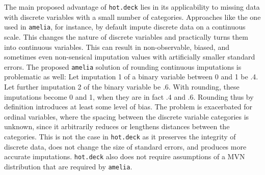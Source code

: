 \documentclass[12pt,econ]{sources/authesis}
\begin{document}
The main proposed advantage of \texttt{hot.deck} lies in its applicability to missing data with discrete variables with a small number of categories. Approaches like the one used in \texttt{amelia}, for instance, by default impute discrete data on a continuous scale. This changes the nature of discrete variables and practically turns them into continuous variables. This can result in non-observable, biased, and sometimes even non-sensical imputation values with artificially smaller standard errors. The proposed \texttt{amelia} solution of rounding continuous imputations is problematic as well: Let imputation 1 of a binary variable between 0 and 1 be .4. Let further imputation 2 of the binary variable be .6. With rounding, these imputations become 0 and 1, when they are in fact .4 and .6. Rounding thus by definition introduces at least some level of bias. The problem is exacerbated for ordinal variables, where the spacing between the discrete variable categories is unknown, since it arbitrarily reduces or lengthens distances between the categories. This is not the case in \texttt{hot.deck} as it preserves the integrity of discrete data, does not change the size of standard errors, and produces more accurate imputations. \texttt{hot.deck} also does not require assumptions of a MVN distribution that are required by \texttt{amelia}.
\end{document}

